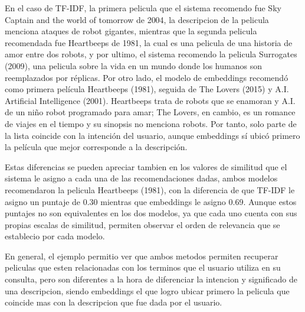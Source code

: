 En el caso de TF-IDF, la primera pelicula que el sistema recomendo fue Sky Captain and the world of tomorrow de 2004, la descripcion de la pelicula menciona ataques de robot gigantes, mientras que la segunda pelicula recomendada fue Heartbeeps de 1981, la cual es una pelicula de una historia de amor entre dos robots, y por ultimo, el sistema recomendo la pelicula Surrogates (2009), una pelicula sobre la vida en un mundo donde los humanos son reemplazados por réplicas. Por otro lado, el modelo de embeddings recomendó como primera película Heartbeeps (1981), seguida de The Lovers (2015) y A.I. Artificial Intelligence (2001). Heartbeeps trata de robots que se enamoran y A.I. de un niño robot programado para amar; The Lovers, en cambio, es un romance de viajes en el tiempo y su sinopsis no menciona robots. Por tanto, solo parte de la lista coincide con la intención del usuario, aunque embeddings sí ubicó primero la película que mejor corresponde a la descripción.

Estas diferencias se pueden apreciar tambien en los valores de similitud que el sistema le asigno a cada una de las recomendaciones dadas, ambos modelos recomendaron la pelicula Heartbeeps (1981), con la diferencia de que TF-IDF le asigno un puntaje de 0.30 mientras que embeddings le asigno 0.69. Aunque estos puntajes no son equivalentes en los dos modelos, ya que cada uno cuenta con sus propias escalas de similitud, permiten observar el orden de relevancia que se establecio por cada modelo.

En general, el ejemplo permitio ver que ambos metodos permiten recuperar peliculas que esten relacionadas con los terminos que el usuario utiliza en su consulta, pero son diferentes a la hora de diferenciar la intencion y significado de una descripcion, siendo embeddings el que logro ubicar primero la pelicula que coincide mas con la descripcion que fue dada por el usuario.  

\begin{table}[htbp]
    \centering
    \caption{Comparación de recomendaciones para la consulta "una película de robots que se enamoran".}
    \label{tab:comparacion_recomendaciones}
\end{table}

